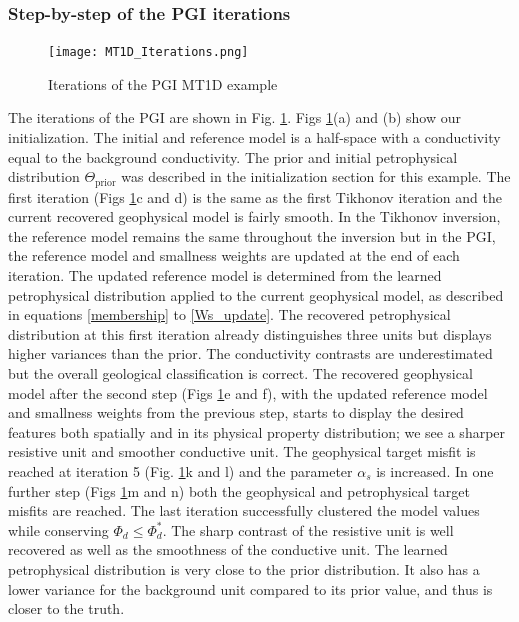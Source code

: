 \documentclass[extra]{gji} %
\begin{document}
\subsubsection{Step-by-step of the PGI iterations}

\begin{figure}
\centering
\texttt{[image: MT1D\_Iterations.png]}
\caption[]{Iterations of the PGI MT1D example}
\label{fig:MT1D_Iterations}
\end{figure}

The iterations of the PGI are shown in Fig. \ref{fig:MT1D_Iterations}. Figs \ref{fig:MT1D_Iterations}(a) and (b) show our initialization. The initial and reference model is a half-space with a conductivity equal to the background conductivity. The prior and initial petrophysical distribution $\Theta_{\text{prior}}$ was described in the initialization section for this example. The first iteration (Figs \ref{fig:MT1D_Iterations}c and d) is the same as the first Tikhonov iteration and the current recovered geophysical model is fairly smooth. In the Tikhonov inversion, the reference model remains the same throughout the inversion but in the PGI, the reference model and smallness weights are updated at the end of each iteration. The updated reference model is determined from the learned petrophysical distribution applied to the current geophysical model, as described in equations \ref{membership} to \ref{Ws_update}. The recovered petrophysical distribution at this first iteration already distinguishes three units but displays higher variances than the prior. The conductivity contrasts are underestimated but the overall geological classification is correct. The recovered geophysical model after the second step (Figs \ref{fig:MT1D_Iterations}e and f), with the updated reference model and smallness weights from the previous step, starts to display the desired features both spatially and in its physical property distribution; we see a sharper resistive unit and smoother conductive unit. The geophysical target misfit is reached at iteration 5 (Fig. \ref{fig:MT1D_Iterations}k and l) and the parameter $\alpha_s$ is increased. In one further step (Figs \ref{fig:MT1D_Iterations}m and n) both the geophysical and petrophysical target misfits are reached. The last iteration successfully clustered the model values while conserving $\Phi_d\leq\Phi_d^*$. The sharp contrast of the resistive unit is well recovered as well as the smoothness of the conductive unit. The learned petrophysical distribution is very close to the prior distribution. It also has a lower variance for the background unit compared to its prior value, and thus is closer to the truth.
\end{document}
